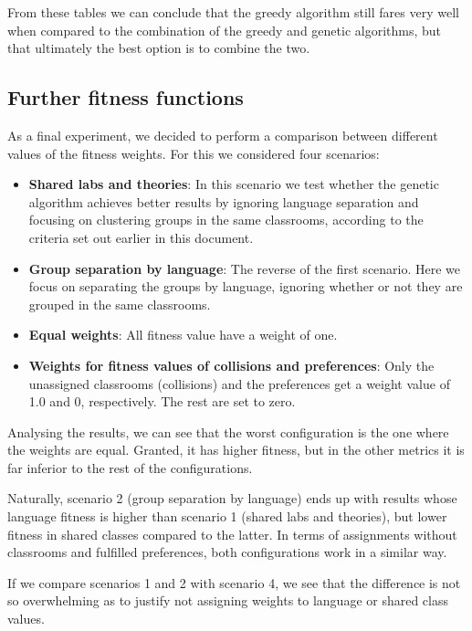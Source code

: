 From these tables we can conclude that the greedy algorithm still fares very well when compared to the combination of the greedy and genetic algorithms, but that ultimately the best option is to combine the two.



\subsection{Further fitness functions}

As a final experiment, we decided to perform a comparison between different values of the fitness weights. For this we considered four scenarios:

\begin{itemize}
    \item \textbf{Shared labs and theories}: In this scenario we test whether the genetic algorithm achieves better results by ignoring language separation and focusing on clustering groups in the same classrooms, according to the criteria set out earlier in this document.
    \item \textbf{Group separation by language}: The reverse of the first scenario. Here we focus on separating the groups by language, ignoring whether or not they are grouped in the same classrooms.
    \item \textbf{Equal weights}: All fitness value have a weight of one.
    \item \textbf{Weights for fitness values of collisions and preferences}: Only the unassigned classrooms (collisions) and the preferences get a weight value of 1.0 and 0, respectively. The rest are set to zero.
\end{itemize}

Analysing the results, we can see that the worst configuration is the one where the weights are equal. Granted, it has higher fitness, but in the other metrics it is far inferior to the rest of the configurations.

Naturally, scenario 2 (group separation by language) ends up with results whose language fitness is higher than scenario 1 (shared labs and theories), but lower fitness in shared classes compared to the latter. In terms of assignments without classrooms and fulfilled preferences, both configurations work in a similar way.

If we compare scenarios 1 and 2 with scenario 4, we see that the difference is not so overwhelming as to justify not assigning weights to language or shared class values.



